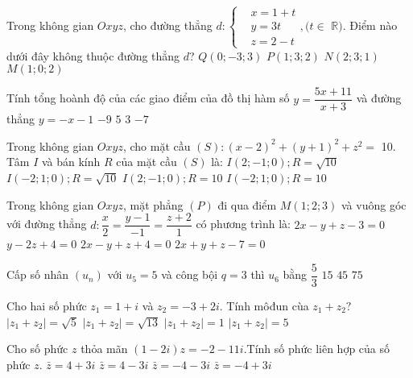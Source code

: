\begin{ex}%
Trong không gian $O x y z$, cho đường thẳng $d\colon\left\{\begin{aligned}&x=1+t \\& y=3 t \\& z=2-t\end{aligned},(t \in\right.$ $\mathbb{R})$. Điểm nào dưới đây không thuộc đường thẳng $d$?
\choice
{$Q(0;-3; 3)$}
{\True $P(1; 3; 2)$}
{$N(2; 3; 1)$}
{$M(1; 0; 2)$}

\end{ex}
\begin{ex}%
Tính tổng hoành độ của các giao điểm của đồ thị hàm số $y=\dfrac{5 x+11}{x+3}$ và đường thẳng $y=-x-1$ 
\choice
{\True $-9$}
{$5$}
{$3$}
{$-7$}

\end{ex}
\begin{ex}%
Trong không gian $O x y z$, cho mặt cầu $(S)\colon(x-2)^2+(y+1)^2+z^2=$ 10. Tâm $I$ và bán kính $R$ của mặt cầu $(S)$ là:
\choice
{\True $I(2;-1; 0); R=\sqrt{10}$}
{$I(-2; 1; 0); R=\sqrt{10}$}
{$I(2;-1; 0); R=10$}
{$I(-2; 1; 0); R=10$}

\end{ex}
\begin{ex}%
Trong không gian $O x y z$, mặt phẳng $(P)$ đi qua điểm $M(1; 2; 3)$ và vuông góc với đường thẳng $d\colon \dfrac{x}{2}=\dfrac{y-1}{-1}=\dfrac{z+2}{1}$ có phương trình là:
\choice
{\True $2 x-y+z-3=0$}
{$y-2 z+4=0$}
{$2 x-y+z+4=0$}
{$2 x+y+z-7=0$}

\end{ex}
\begin{ex}%
Cấp số nhân $\left(u_n\right)$ với $u_5=5$ và công bội $q=3$ thì $u_6$ bằng
\choice
{$\dfrac{5}{3}$}
{\True $15$}
{$45$}
{$75$}

\end{ex}
\begin{ex}%
Cho hai số phức $z_1=1+i$ và $z_2=-3+2 i$. Tính môđun cùa $z_1+z_2?$ 
\choice
{$\left|z_1+z_2\right|=\sqrt{5}$}
{\True $\left|z_1+z_2\right|=\sqrt{13}$}
{$\left|z_1+z_2\right|=1$}
{$\left|z_1+z_2\right|=5$}

\end{ex}
\begin{ex}%
Cho số phức $z$ thỏa mãn $(1-2 i) z=-2-11 i$.Tính số phức liên hợp của số phức $z$.
\choice
{\True $\bar{z}=4+3 i$}
{$\bar{z}=4-3 i$}
{$\bar{z}=-4-3 i$}
{$\bar{z}=-4+3 i$}

\end{ex}
